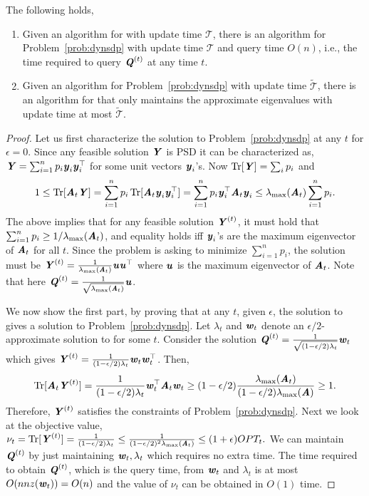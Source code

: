 \begin{proposition}\label{prop:equiv sdp}
The following holds,
\begin{enumerate}
    \item Given an algorithm for  with update time $\mathcal{T}$, there is an algorithm for Problem~\ref{prob:dynsdp} with update time 
 $\mathcal{T}$ and query time $O(n)$, i.e., the time required to query $\QQ^{(t)}$ at any time $t$. 
    \item Given an algorithm for Problem~\ref{prob:dynsdp} with update time $\widetilde{\mathcal{T}}$, there is an algorithm for  that only maintains the approximate eigenvalues with update time at most $\widetilde{\mathcal{T}}$.
\end{enumerate}
\end{proposition}
\begin{proof}
  Let us first characterize the solution to Problem~\ref{prob:dynsdp} at any $t$ for $\epsilon=0$. Since any feasible solution $\YY$ is PSD it can be characterized as, $\YY = \sum_{i=1}^n p_i \yy_i\yy_i^{\top}$ for some unit vectors $\yy_i$'s. Now $\Tr[\YY] = \sum_i p_i$ and
  \[
 1\leq  \Tr[\AA_t\YY] = \sum_{i=1}^n p_i \Tr[\AA_t \yy_i\yy_i^{\top}] = \sum_{i=1}^n p_i \yy_i^{\top}\AA_t\yy_i \leq \lambda_{\max}(\AA_t) \sum_{i=1}^n p_i.
  \]
  The above implies that for any feasible solution $\YY^{(t)}$, it must hold that $\sum_{i=1}^n p_i\geq 1/\lambda_{\max}(\AA_t)$, and equality holds iff $\yy_i$'s are the maximum eigenvector of $\AA_t$ for all $t$. Since the problem is asking to minimize $\sum_{i=1}^n p_i$, the solution must be $\YY^{(t)} = \frac{1}{\lambda_{\max}(\AA_t)}\uu\uu^{\top}$ where $\uu$ is the maximum eigenvector of $\AA_t$. Note that here $\QQ^{(t)} = \frac{1}{\sqrt{\lambda_{\max}(\AA_t)}}\uu$. 

  We now show the first part, by proving that at any $t$, given $\epsilon$, the solution to  gives a solution to Problem~\ref{prob:dynsdp}. Let $\lambda_t$ and $\ww_t$ denote an $\epsilon/2$-approximate solution to  for some $t$. Consider the solution $\QQ^{(t)} = \frac{1}{\sqrt{(1-\epsilon/2)\lambda_t}}\ww_t$ which gives $\YY^{(t)} = \frac{1}{(1-\epsilon/2)\lambda_t}\ww_t\ww_t^{\top}$. Then,
  \[\Tr[\AA_t\YY^{(t)}] = \frac{1}{(1-\epsilon/2)\lambda_t} \ww_t^{\top}\AA_t\ww_t \geq (1-\epsilon/2)\frac{\lambda_{\max}(\AA_t)}{(1-\epsilon/2)\lambda_{\max}(\AA)}\geq 1.\]
Therefore, $\YY^{(t)}$ satisfies the constraints of Problem~\ref{prob:dynsdp}. Next we look at the objective value, $\nu_t = \Tr[\YY^{(t)}] = \frac{1}{(1-\epsilon/2)\lambda_t} \leq \frac{1}{(1-\epsilon/2)^2\lambda_{\max}(\AA_t)} \leq (1+\epsilon) OPT_t.$ We can maintain $\QQ^{(t)}$ by just maintaining $\ww_t,\lambda_t$ which requires no extra time. The time required to obtain $\QQ^{(t)}$, which is the query time, from $\ww_t$ and $\lambda_t$ is at most $O(nnz(\ww_t))=O(n)$ and the value of $\nu_t$ can be obtained in $O(1)$ time. 


\end{proof}
